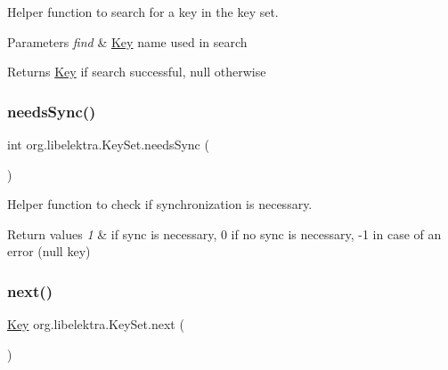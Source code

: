 Helper function to search for a key in the key set. 


\begin{DoxyParams}{Parameters}
{\em find} & \hyperlink{classorg_1_1libelektra_1_1Key}{Key} name used in search \\
\hline
\end{DoxyParams}
\begin{DoxyReturn}{Returns}
\hyperlink{classorg_1_1libelektra_1_1Key}{Key} if search successful, null otherwise 
\end{DoxyReturn}
\mbox{\label{classorg_1_1libelektra_1_1KeySet_a9a21c729da19bc6fb2e7f33fe06ee15e}} 
\subsubsection{\texorpdfstring{needs\+Sync()}{needsSync()}}
{\footnotesize\ttfamily int org.\+libelektra.\+Key\+Set.\+needs\+Sync (\begin{DoxyParamCaption}{ }\end{DoxyParamCaption})\hspace{0.3cm}{\ttfamily [inline]}}



Helper function to check if synchronization is necessary. 


\begin{DoxyRetVals}{Return values}
{\em 1} & if sync is necessary, 0 if no sync is necessary, -\/1 in case of an error (null key) \\
\hline
\end{DoxyRetVals}
\mbox{\label{classorg_1_1libelektra_1_1KeySet_a92aa593320132e4272602dda29aee2c7}} 
\subsubsection{\texorpdfstring{next()}{next()}}
{\footnotesize\ttfamily \hyperlink{classorg_1_1libelektra_1_1Key}{Key} org.\+libelektra.\+Key\+Set.\+next (\begin{DoxyParamCaption}{ }\end{DoxyParamCaption})\hspace{0.3cm}{\ttfamily [inline]}}



